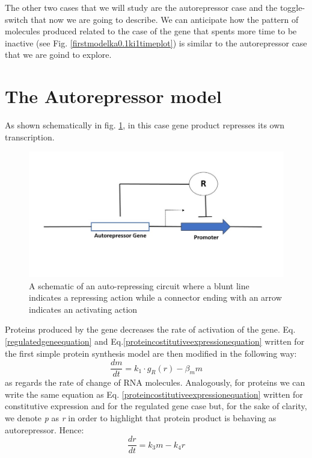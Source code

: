 \documentclass[12pt,a4paper]{report}
\begin{document}
The other two cases that we will study are the autorepressor case and the toggle-switch that now we are going to describe. We can anticipate how the pattern of molecules produced related to the case of the gene that spents more time to be inactive (see Fig. \ref{firstmodelka0.1ki1timeplot}) is similar to the autorepressor case that we are goind to explore.
\newpage






\section{The Autorepressor model}

As shown schematically in fig. \ref{autorepressor}, in this case gene product represses its own transcription. 


\begin{figure}[!ht]
\centering
\includegraphics[scale=0.50]{autorepressor.jpg}
\caption{A schematic of an auto-repressing circuit where a blunt line indicates a repressing action while a connector ending with an arrow indicates an activating action}
\label{autorepressor}
\end{figure}

Proteins produced by the gene decreases the rate of activation of the gene. Eq.\ref{regulatedgeneequation} and Eq.\ref{proteincostitutiveexpressionequation} written for the first simple protein synthesis model are then modified in the following way:
\begin{equation}
 \frac{dm}{dt} = k_{1} \cdot g_{R}(r) - \beta_{m}m
\end{equation}
as regards the rate of change of RNA molecules. Analogously, for proteins we can write the same equation as Eq. \ref{proteincostitutiveexpressionequation} written for constitutive expression and for the regulated gene case but, for the sake of clarity, we denote \emph{p} as \emph{r} in order to highlight that protein product is behaving as autorepressor. Hence:
\begin{equation}
 \frac{dr}{dt} = k_{3}m - k_{4}r
\end{equation}
\end{document}
